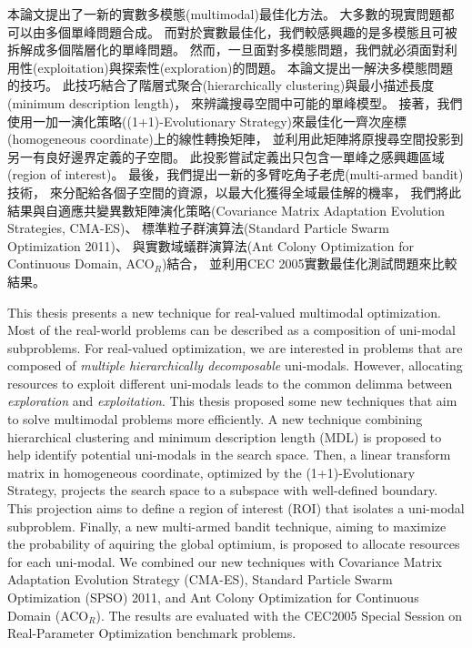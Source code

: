 \begin{abstractzh}
本論文提出了一新的實數多模態(multimodal)最佳化方法。
大多數的現實問題都可以由多個單峰問題合成。
而對於實數最佳化，我們較感興趣的是多模態且可被拆解成多個階層化的單峰問題。
然而，一旦面對多模態問題，我們就必須面對利用性(exploitation)與探索性(exploration)的問題。
本論文提出一解決多模態問題的技巧。
此技巧結合了階層式聚合(hierarchically clustering)與最小描述長度(minimum description length)， 來辨識搜尋空間中可能的單峰模型。
接著，我們使用一加一演化策略((1+1)-Evolutionary Strategy)來最佳化一齊次座標(homogeneous coordinate)上的線性轉換矩陣，
並利用此矩陣將原搜尋空間投影到另一有良好邊界定義的子空間。
此投影嘗試定義出只包含一單峰之感興趣區域(region of interest)。
最後，我們提出一新的多臂吃角子老虎(multi-armed bandit)技術，
來分配給各個子空間的資源，以最大化獲得全域最佳解的機率，
我們將此結果與自適應共變異數矩陣演化策略(Covariance Matrix Adaptation Evolution Strategies, CMA-ES)、
標準粒子群演算法(Standard Particle Swarm Optimization 2011)、
與實數域蟻群演算法(Ant Colony Optimization for Continuous Domain, ACO$_R$)結合，
並利用CEC 2005實數最佳化測試問題來比較結果。
\end{abstractzh}

\begin{abstracten}
This thesis presents a new technique for real-valued multimodal optimization.
Most of the real-world problems can be described as a composition of uni-modal subproblems.
For real-valued optimization, we are interested in problems that are composed of \textit{multiple hierarchically decomposable} uni-modals.
However, allocating resources to exploit different uni-modals leads to the 
common delimma between \textit{exploration} and \textit{exploitation}.
This thesis proposed some new techniques that aim to solve multimodal problems more efficiently.
A new technique combining hierarchical clustering and minimum description length (MDL) 
is proposed to help identify potential uni-modals in the search space.
Then, a linear transform matrix in homogeneous coordinate, optimized by the (1+1)-Evolutionary Strategy,
projects the search space to a subspace with well-defined boundary.
This projection aims to define a region of interest (ROI) that isolates a uni-modal subproblem.
Finally, a new multi-armed bandit technique, aiming to maximize the probability of aquiring the global optimium,
is proposed to allocate resources for each uni-modal.
We combined our new techniques with Covariance Matrix Adaptation Evolution Strategy (CMA-ES), 
Standard Particle Swarm Optimization (SPSO) 2011, and Ant Colony Optimization for Continuous Domain (ACO$_R$).
The results are evaluated with the CEC2005 Special Session on Real-Parameter Optimization benchmark problems.
\end{abstracten}

